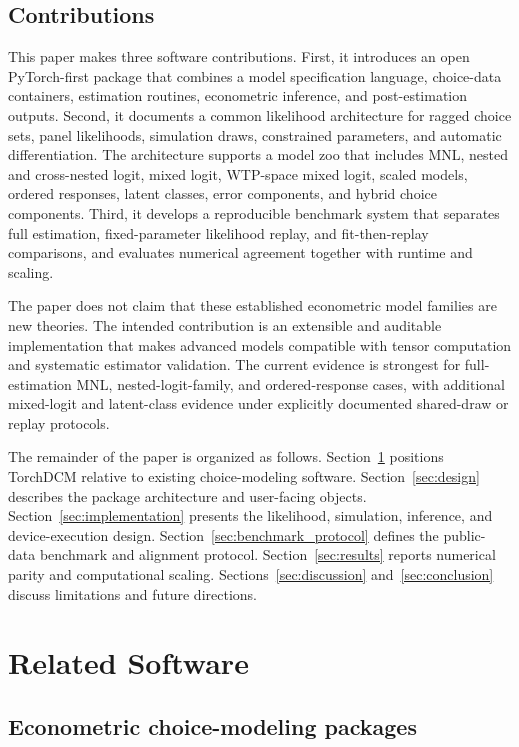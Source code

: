 \documentclass[11pt]{article}
\begin{document}
\subsection{Contributions}

This paper makes three software contributions. First, it introduces an open
PyTorch-first package that combines a model specification language, choice-data
containers, estimation routines, econometric inference, and post-estimation
outputs. Second, it documents a common likelihood architecture for ragged
choice sets, panel likelihoods, simulation draws, constrained parameters, and
automatic differentiation. The architecture supports a model zoo that includes
MNL, nested and cross-nested logit, mixed logit, WTP-space mixed logit, scaled
models, ordered responses, latent classes, error components, and hybrid choice
components. Third, it develops a reproducible benchmark system that separates
full estimation, fixed-parameter likelihood replay, and fit-then-replay
comparisons, and evaluates numerical agreement together with runtime and
scaling.

The paper does not claim that these established econometric model families are
new theories. The intended contribution is an extensible and auditable
implementation that makes advanced models compatible with tensor computation
and systematic estimator validation. The current evidence is strongest for
full-estimation MNL, nested-logit-family, and ordered-response cases, with
additional mixed-logit and latent-class evidence under explicitly documented
shared-draw or replay protocols.

The remainder of the paper is organized as follows. Section~\ref{sec:related}
positions TorchDCM relative to existing choice-modeling software.
Section~\ref{sec:design} describes the package architecture and user-facing
objects. Section~\ref{sec:implementation} presents the likelihood, simulation,
inference, and device-execution design. Section~\ref{sec:benchmark_protocol}
defines the public-data benchmark and alignment protocol. Section~\ref{sec:results}
reports numerical parity and computational scaling. Sections~\ref{sec:discussion}
and~\ref{sec:conclusion} discuss limitations and future directions.

\section{Related Software}
\label{sec:related}

\subsection{Econometric choice-modeling packages}
\end{document}
